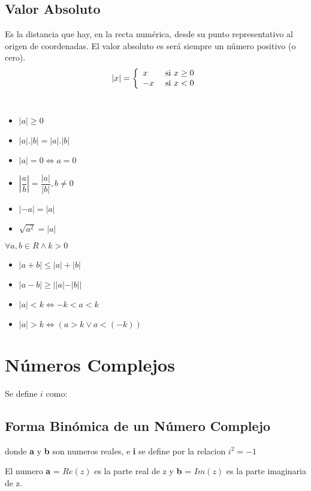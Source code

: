 \documentclass[10pt]{article}
\begin{document}
\subsection{Valor Absoluto}
Es la distancia que hay, en la recta numérica, desde su punto representativo al origen de coordenadas. El valor absoluto es será siempre un número positivo (o cero).
\[|x| = \left\{ \begin{array}{ll}
x  &$ si $x \geq 0\\
-x &$ si $x < 0\\
\end{array}\right.\]\
\begin{multicols}{2}
\begin{itemize}
\item $|a| \geq 0$
\item $|a|.|b| = |a|.|b|$
\item $|a|=0 \iff a=0$
\item $\left|\dfrac{a}{b}\right| = \dfrac{|a|}{|b|}, b \not = 0$
\item $|-a| = |a|$
\item $\sqrt{a^2} = |a|$
\end{itemize}
\end{multicols}
$\forall a, b \in R \land k>0$
\begin{multicols}{2}
\begin{itemize}
\item $|a+b| \leq |a| + |b|$
\item $|a-b| \geq ||a|-|b||$
\item $|a|<k \iff -k < a < k$
\item $|a|>k \iff (a>k \lor a<(-k))$
\end{itemize}
\end{multicols}

\newpage
\section{Números Complejos}
Se define $i$ como: \hspace{4cm} 
\subsection{Forma Binómica de un Número Complejo}
\begin{center}
\hfill donde \textbf{a} y \textbf{b} son numeros reales, e \textbf{i} se define por la relacion $i^2=-1$
\end{center}
El numero \textbf{a} = $Re(z)$ es la parte real de z y \textbf{b} = $Im(z)$ es la parte imaginaria de z.
\end{document}

